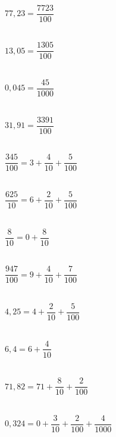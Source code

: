 \begin{multicols}{4}
    \vspace{0.5em}\\
    $77,23=\dfrac{7723}{100}$

    \vspace{0.5em}\\
    $13,05=\dfrac{1305}{100}$

    \vspace{0.5em}\\
    $0,045=\dfrac{45}{1000}$

    \vspace{0.5em}\\
    $31,91=\dfrac{3391}{100}$
\end{multicols}

\begin{multicols}{4}
    \vspace{0.5em}\\
    $\dfrac{345}{100}=3+\dfrac{4}{10}+\dfrac{5}{100}$

    \vspace{0.5em}\\
    $\dfrac{625}{10}=6+\dfrac{2}{10}+\dfrac{5}{100}$

    \vspace{0.5em}\\
    $\dfrac{8}{10}=0+\dfrac{8}{10}$

    \vspace{0.5em}\\
    $\dfrac{947}{100}=9+\dfrac{4}{10}+\dfrac{7}{100}$
\end{multicols}

\begin{multicols}{4}
    \vspace{0.5em}\\
    $4,25=4+\dfrac{2}{10}+\dfrac{5}{100}$

    \vspace{0.5em}\\
    $6,4=6+\dfrac{4}{10}$

    \vspace{0.5em}\\
    $71,82=71+\dfrac{8}{10}+\dfrac{2}{100}$

    \vspace{0.5em}\\
    $0,324=0+\dfrac{3}{10}+\dfrac{2}{100}+\dfrac{4}{1000}$
\end{multicols}
